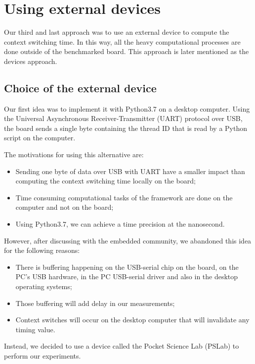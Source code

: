 \section{Using external devices \label{sec:external}}

Our third and last approach was to use an external device to compute the context switching time.
In this way, all the heavy computational processes are done outside of the benchmarked board.
This approach is later mentioned as the devices approach.

\subsection{Choice of the external device}

Our first idea was to implement it with Python3.7 on a desktop computer.
Using the Universal Asynchronous Receiver-Transmitter (UART) protocol over USB, the board sends a single byte containing the thread ID that is read by a Python script on the computer.

The motivations for using this alternative are:
\begin{itemize}
  \item Sending one byte of data over USB with UART have a smaller impact than computing the context switching time locally on the board;
  \item Time consuming computational tasks of the framework are done on the computer and not on the board;
  \item Using Python3.7, we can achieve a time precision at the nanosecond.
\end{itemize}

However, after discussing with the embedded community, we abandoned this idea for the following reasons:
\begin{itemize}
  \item There is buffering happening on the USB-serial chip on the board, on the PC's USB hardware, in the PC USB-serial driver 
    and also in the desktop operating systems;
  \item Those buffering will add delay in our measurements;
  \item Context switches will occur on the desktop computer that will invalidate any timing value.
\end{itemize}


Instead, we decided to use a device called the Pocket Science Lab (PSLab) to perform our experiments.

